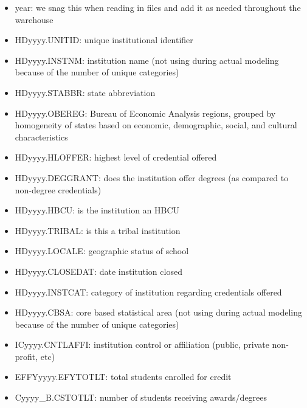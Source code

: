 \documentclass[sigconf, authorversion, nonacm]{acmart}
\begin{document}
        \begin{itemize}
            \item year: we snag this when reading in files and add it as needed throughout the warehouse
            \item HDyyyy.UNITID: unique institutional identifier
            \item HDyyyy.INSTNM: institution name (not using during actual modeling because of the number of unique categories)
            \item HDyyyy.STABBR: state abbreviation
            \item HDyyyy.OBEREG: Bureau of Economic Analysis regions, grouped by homogeneity of states based on economic, demographic, social, and cultural characteristics
            \item HDyyyy.HLOFFER: highest level of credential offered
            \item HDyyyy.DEGGRANT: does the institution offer degrees (as compared to non-degree credentials)
            \item HDyyyy.HBCU: is the institution an HBCU
            \item HDyyyy.TRIBAL: is this a tribal institution
            \item HDyyyy.LOCALE: geographic status of school
            \item HDyyyy.CLOSEDAT: date institution closed
            \item HDyyyy.INSTCAT: category of institution regarding credentials offered
            \item HDyyyy.CBSA: core based statistical area (not using during actual modeling because of the number of unique categories)
            \item ICyyyy.CNTLAFFI: institution control or affiliation (public, private non-profit, etc)
            \item EFFYyyyy.EFYTOTLT: total students enrolled for credit
            \item Cyyyy\_B.CSTOTLT: number of students receiving awards/degrees
        \end{itemize}
\end{document}
